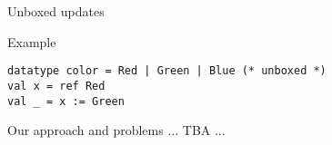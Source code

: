 \documentclass[presentation]{beamer}
\begin{document}
\begin{frame}[fragile]{Unboxed updates}
  \begin{block}{Example}
\begin{verbatim}
datatype color = Red | Green | Blue (* unboxed *)
val x = ref Red
val _ = x := Green
\end{verbatim}
  \end{block}
\end{frame}

\begin{frame}[fragile]{Our approach and problems}
  $\ldots$ TBA $\ldots$
\end{frame}
\end{document}
